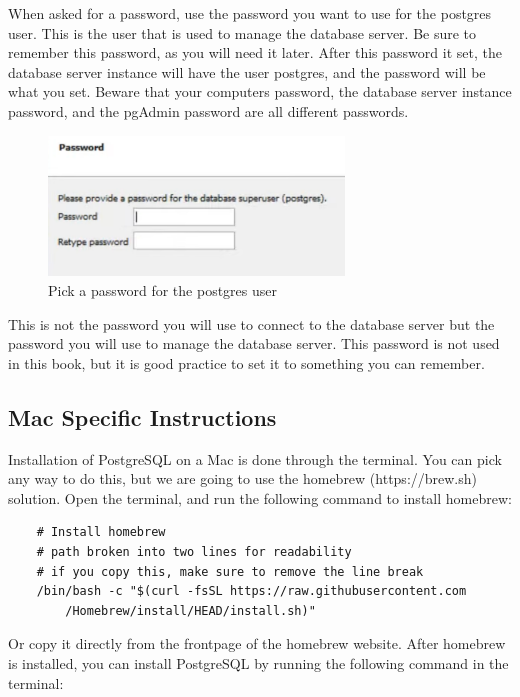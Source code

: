 When asked for a password, use the password you want to use for the postgres user. This is the user that is used to manage the database server. Be sure to remember this password, as you will need it later. After this password it set, the database server instance will have the user postgres, and the password will be what you set. Beware that your computers password, the database server instance password, and the pgAdmin password are all different passwords.

\begin{figure}[htb]
    \centering
    \includegraphics[width=0.7\textwidth]{content/1-relational-databases/figures/1.install-for-windows-3.png}
    \caption{Pick a password for the postgres user}
    \label{fig:1.postgresql-download-3.png}
\end{figure}


This is not the password you will use to connect to the database server but the password you will use to manage the database server. This password is not used in this book, but it is good practice to set it to something you can remember.

\subsection{Mac Specific Instructions}
Installation of PostgreSQL on a Mac is done through the terminal. You can pick any way to do this, but we are going to use the homebrew (https://brew.sh) solution. Open the terminal, and run the following command to install homebrew: 

\begin{verbatim}
    # Install homebrew
    # path broken into two lines for readability
    # if you copy this, make sure to remove the line break
    /bin/bash -c "$(curl -fsSL https://raw.githubusercontent.com
        /Homebrew/install/HEAD/install.sh)"
\end{verbatim}

Or copy it directly from the frontpage of the homebrew website. After homebrew is installed, you can install PostgreSQL by running the following command in the terminal:

